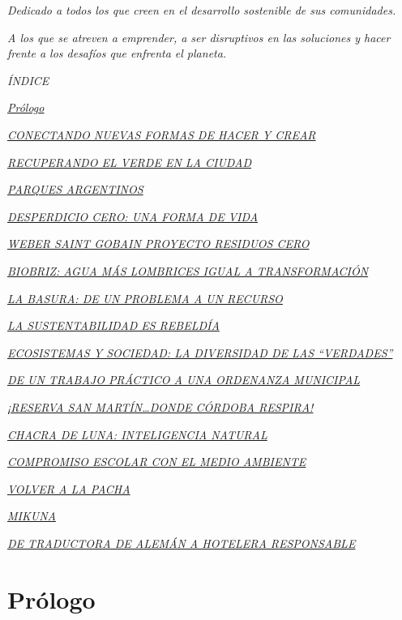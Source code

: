 \documentclass[
]{article}
\begin{document}
\newpage

\emph{Dedicado a todos los que creen en el desarrollo sostenible de sus
comunidades.}

\emph{A los que se atreven a emprender, a ser disruptivos en las
soluciones y hacer frente a los desafíos que enfrenta el planeta.}

\newpage

\emph{ÍNDICE}

\protect\hyperlink{_Toc486429354}{\emph{Prólogo}}

\protect\hyperlink{section}{\emph{CONECTANDO NUEVAS FORMAS DE HACER Y
CREAR}}

\protect\hyperlink{recuperando-el-verde-en-la-ciudad}{\emph{RECUPERANDO
EL VERDE EN LA CIUDAD}}

\protect\hyperlink{parques-argentinos}{\emph{PARQUES ARGENTINOS}}

\protect\hyperlink{_Toc486429358}{\emph{DESPERDICIO CERO: UNA FORMA DE
VIDA}}

\protect\hyperlink{section-1}{\emph{WEBER SAINT GOBAIN PROYECTO RESIDUOS
CERO}}

\protect\hyperlink{section-3}{\emph{BIOBRIZ: AGUA MÁS LOMBRICES IGUAL A
TRANSFORMACIÓN}}

\protect\hyperlink{section-4}{\emph{LA BASURA: DE UN PROBLEMA A UN
RECURSO}}

\protect\hyperlink{section-5}{\emph{LA SUSTENTABILIDAD ES REBELDÍA}}

\protect\hyperlink{ecosistemas-y-sociedad-la-diversidad-de-las-verdades}{\emph{ECOSISTEMAS
Y SOCIEDAD: LA DIVERSIDAD DE LAS ``VERDADES''}}

\protect\hyperlink{section-6}{\emph{DE UN TRABAJO PRÁCTICO A UNA
ORDENANZA MUNICIPAL}}

\protect\hyperlink{section-7}{\emph{¡RESERVA SAN MARTÍN\ldots DONDE
CÓRDOBA RESPIRA!}}

\protect\hyperlink{section-9}{\emph{CHACRA DE LUNA: INTELIGENCIA
NATURAL}}

\protect\hyperlink{section-11}{\emph{COMPROMISO ESCOLAR CON EL MEDIO
AMBIENTE}}

\protect\hyperlink{_Toc486429368}{\emph{VOLVER A LA PACHA}}

\protect\hyperlink{mikuna}{\emph{MIKUNA}}

\protect\hyperlink{de-traductora-de-alemuxe1n-a-hotelera-responsable}{\emph{DE
TRADUCTORA DE ALEMÁN A HOTELERA RESPONSABLE}}

\cleardoublepage

\hypertarget{pruxf3logo}{%
\section{Prólogo}\label{pruxf3logo}}
\end{document}
